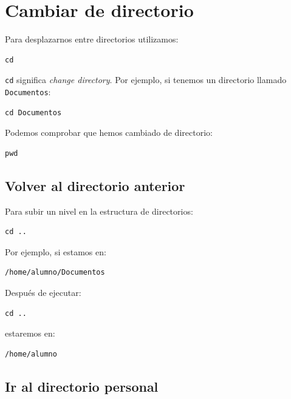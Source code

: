 \documentclass[11pt,a4paper]{article}
\begin{document}
\section{Cambiar de directorio}


Para desplazarnos entre directorios utilizamos:


\begin{lstlisting}
cd
\end{lstlisting}


\noindent \texttt{cd} significa \textit{change directory}. Por ejemplo, si tenemos un directorio llamado
\texttt{Documentos}:


\begin{lstlisting}
cd Documentos
\end{lstlisting}


\noindent Podemos comprobar que hemos cambiado de directorio:


\begin{lstlisting}
pwd
\end{lstlisting}


\subsection{Volver al directorio anterior}


Para subir un nivel en la estructura de directorios:


\begin{lstlisting}
cd ..
\end{lstlisting}


\noindent Por ejemplo, si estamos en:


\begin{lstlisting}
/home/alumno/Documentos
\end{lstlisting}


\noindent Después de ejecutar:


\begin{lstlisting}
cd ..
\end{lstlisting}


\noindent estaremos en:


\begin{lstlisting}
/home/alumno
\end{lstlisting}


\subsection{Ir al directorio personal}
\end{document}
